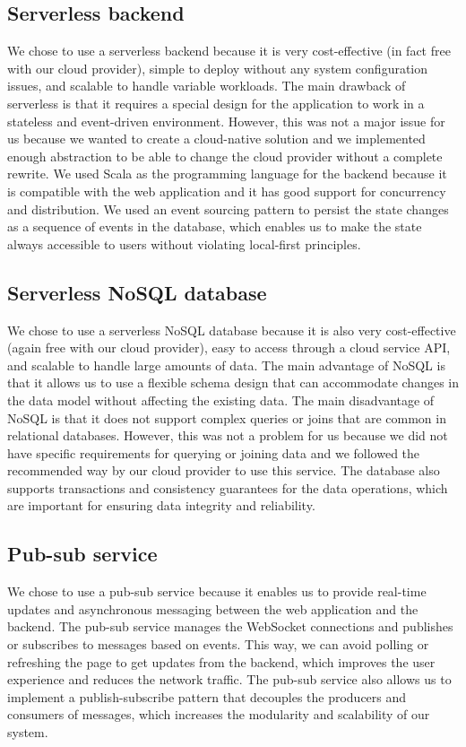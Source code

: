 \documentclass[
	ngerman,
	ruledheaders=section,   %
	class=report,		    %
	thesis={type=bachelor}, %
	accentcolor=9c,			%
	custommargins=true,    %
	marginpar=false,        %
	parskip=half-,          %
	fontsize=11pt,          %
]{tudapub}
\begin{document}
\subsection{Serverless backend} 
We chose to use a serverless backend because it is very cost-effective (in fact free with our cloud provider), simple to deploy without any system configuration issues, and scalable to handle variable workloads. The main drawback of serverless is that it requires a special design for the application to work in a stateless and event-driven environment. However, this was not a major issue for us because we wanted to create a cloud-native solution and we implemented enough abstraction to be able to change the cloud provider without a complete rewrite. We used Scala as the programming language for the backend because it is compatible with the web application and it has good support for concurrency and distribution. We used an event sourcing pattern to persist the state changes as a sequence of events in the database, which enables us to make the state always accessible to users without violating local-first principles.

\subsection{Serverless NoSQL database} 
We chose to use a serverless NoSQL database because it is also very cost-effective (again free with our cloud provider), easy to access through a cloud service API, and scalable to handle large amounts of data. The main advantage of NoSQL is that it allows us to use a flexible schema design that can accommodate changes in the data model without affecting the existing data. The main disadvantage of NoSQL is that it does not support complex queries or joins that are common in relational databases. However, this was not a problem for us because we did not have specific requirements for querying or joining data and we followed the recommended way by our cloud provider to use this service. The database also supports transactions and consistency guarantees for the data operations, which are important for ensuring data integrity and reliability.

\subsection{Pub-sub service}
We chose to use a pub-sub service because it enables us to provide real-time updates and asynchronous messaging between the web application and the backend. The pub-sub service manages the WebSocket connections and publishes or subscribes to messages based on events. This way, we can avoid polling or refreshing the page to get updates from the backend, which improves the user experience and reduces the network traffic. The pub-sub service also allows us to implement a publish-subscribe pattern that decouples the producers and consumers of messages, which increases the modularity and scalability of our system.
\end{document}

